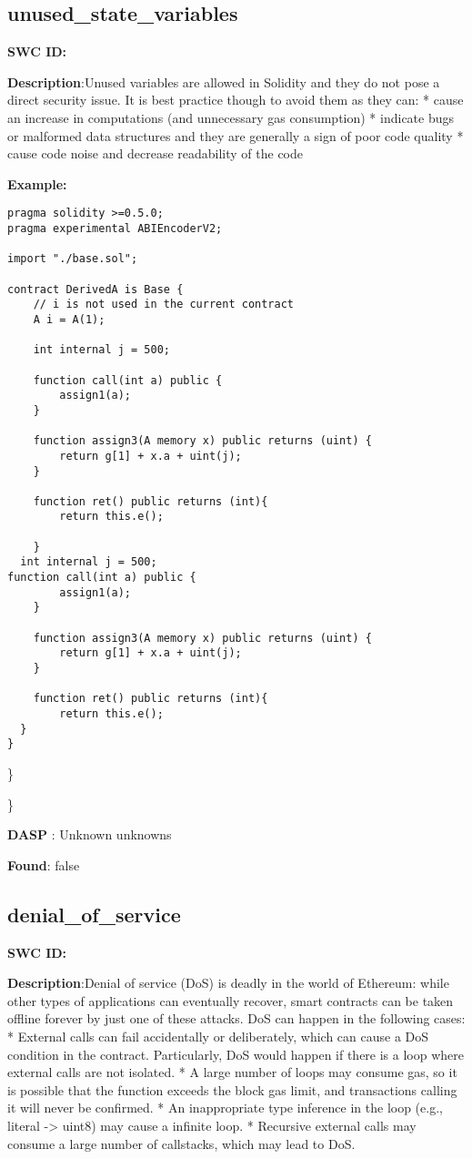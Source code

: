 \documentclass{article}
\begin{document}
\subsection{unused\_state\_variables} 
\textbf{SWC \textunderscore ID:} 

\textbf{Description}:Unused variables are allowed in Solidity and they do not pose a direct security issue. It is best practice though to avoid them as they can:
* cause an increase in computations (and unnecessary gas consumption)
* indicate bugs or malformed data structures and they are generally a sign of poor code quality
* cause code noise and decrease readability of the code


\textbf{Example:} 
\begin{verbatim}
pragma solidity >=0.5.0;
pragma experimental ABIEncoderV2;

import "./base.sol";

contract DerivedA is Base {
    // i is not used in the current contract
    A i = A(1);

    int internal j = 500;

    function call(int a) public {
        assign1(a);
    }

    function assign3(A memory x) public returns (uint) {
        return g[1] + x.a + uint(j);
    }

    function ret() public returns (int){
        return this.e();

    }
  int internal j = 500;
function call(int a) public {
        assign1(a);
    }

    function assign3(A memory x) public returns (uint) {
        return g[1] + x.a + uint(j);
    }

    function ret() public returns (int){
        return this.e();
  }
}

\end{verbatim}\} 

\} 

\textbf{DASP} : Unknown unknowns

\textbf{Found}: false

\subsection{denial\_of\_service} 
\textbf{SWC \textunderscore ID:} 

\textbf{Description}:Denial of service (DoS) is deadly in the world of Ethereum: while other types of applications can eventually recover, smart contracts can be taken offline forever by just one of these attacks. DoS can happen in the following cases:
* External calls can fail accidentally or deliberately, which can cause a DoS condition in the contract. Particularly, DoS would happen if there is a loop where external calls are not isolated.
* A large number of loops may consume gas, so it is possible that the function exceeds the block gas limit, and transactions calling it will never be confirmed.
* An inappropriate type inference in the loop (e.g., literal -> uint8) may cause a infinite loop.
* Recursive external calls may consume a large number of callstacks, which may lead to DoS.
\end{document}

